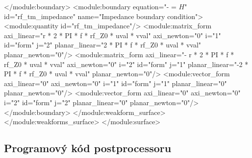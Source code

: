 \documentclass[12pt,a4paper,oneside]{article}
\numberwithin{equation}{section} %
\numberwithin{figure}{section} %
\numberwithin{table}{section} %
\newcommand{\mj}{\mathrm{j}} %
\newcommand{\vecfaz}[1]{\mbox{\underline{\boldmath$#1$}}} %
\begin{document}
\begin{spverbatim}
        </module:boundary>
        <module:boundary equation="-  \frac{\partial \vecfaz{H}}{\partial n_0} = \sqrt{\frac{\mu - \mj \gamma / \omega}{\varepsilon}} \vecfaz{H}" id="rf_tm_impedance" name="Impedance boundary condition">
          <module:quantity id="rf_tm_impedance"/>
          <module:matrix_form axi_linear="r * 2 * PI * f * rf_Z0 * uval * vval" axi_newton="0" i="1" id="form" j="2" planar_linear="2 * PI * f * rf_Z0 * uval * vval" planar_newton="0"/>
          <module:matrix_form axi_linear="- r * 2 * PI * f * rf_Z0 * uval * vval" axi_newton="0" i="2" id="form" j="1" planar_linear="-2 * PI * f * rf_Z0 * uval * vval" planar_newton="0"/>
          <module:vector_form axi_linear="0" axi_newton="0" i="1" id="form" j="1" planar_linear="0" planar_newton="0"/>
          <module:vector_form axi_linear="0" axi_newton="0" i="2" id="form" j="2" planar_linear="0" planar_newton="0"/>
        </module:boundary>
      </module:weakform_surface>
    </module:weakforms_surface>
  </module:surface>
\end{spverbatim}

\subsection*{Programový kód postprocessoru}
\label{postH}
\end{document}

